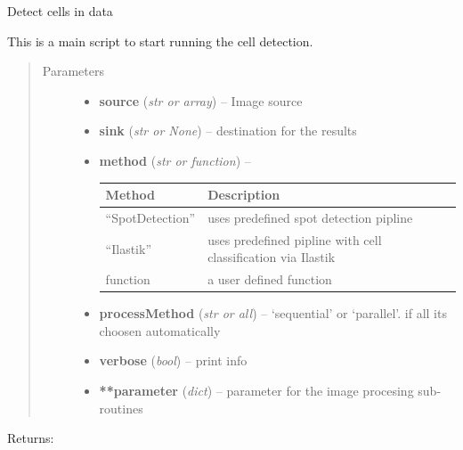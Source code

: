 \documentclass[letterpaper,10pt,english]{sphinxmanual}
\begin{document}
\begin{fulllineitems}
\label{api/ClearMap.ImageProcessing:ClearMap.ImageProcessing.CellDetection.detectCells}
Detect cells in data

This is a main script to start running the cell detection.
\begin{quote}\begin{description}
\item[{Parameters}] \leavevmode\begin{itemize}
\item {} 
\textbf{source} (\emph{str or array}) --
Image source

\item {} 
\textbf{sink} (\emph{str or None}) --
destination for the results

\item {} 
\textbf{method} (\emph{str or function}) --

\begin{tabulary}{\linewidth}{|L|L|}
\hline
\textsf{\relax 
Method
} & \textsf{\relax 
Description
}\\
\hline
``SpotDetection''
 & 
uses predefined spot detection pipline
\\
\hline
``Ilastik''
 & 
uses predefined pipline with cell classification via Ilastik
\\
\hline
function
 & 
a user defined function
\\
\hline\end{tabulary}


\item {} 
\textbf{processMethod} (\emph{str or all}) --
`sequential' or `parallel'. if all its choosen
automatically

\item {} 
\textbf{verbose} (\emph{bool}) --
print info

\item {} 
\textbf{**parameter} (\emph{dict}) --
parameter for the image procesing sub-routines

\end{itemize}

\end{description}\end{quote}

Returns:

\end{fulllineitems}
\end{document}
